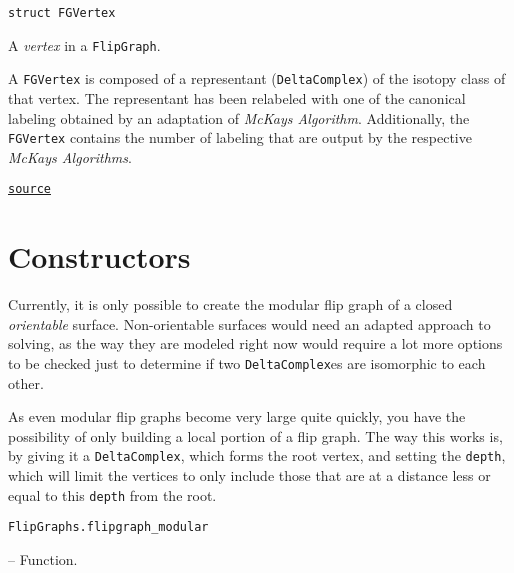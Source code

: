 \begin{adjustwidth}{2em}{0pt}


\begin{verbatim}
struct FGVertex
\end{verbatim}

A \emph{vertex} in a \texttt{FlipGraph}. 

A \texttt{FGVertex} is composed of a representant (\texttt{DeltaComplex}) of the isotopy class of that vertex.  The representant has been relabeled with one of the canonical labeling obtained by an adaptation of \emph{McKay{\textquotesingle}s Algorithm}. Additionally, the \texttt{FGVertex} contains the number of labeling that are output by the respective \emph{McKay{\textquotesingle}s Algorithms}.



\href{https://github.com/schto223/FlipGraphs.jl/blob/e35d43698a06b86273148826b79d585ba04fcd26/src/flipGraph.jl#L33-L41}{\texttt{source}}


\end{adjustwidth}

\section{Constructors}



\label{1468722345706912774}{}


Currently, it is only possible to create the modular flip graph of a closed \emph{orientable} surface. Non-orientable surfaces would need an adapted approach to solving, as the way they are modeled right now would require a lot more options to be checked just to determine if two \texttt{DeltaComplex}es are isomorphic to each other.



As even modular flip graphs become very large quite quickly, you have the possibility of only building a local portion of a flip graph. The way this works is, by giving it a \texttt{DeltaComplex}, which forms the root vertex, and setting the \texttt{depth}, which will limit the vertices to only include those that are at a distance less or equal to this \texttt{depth} from the root.


\hypertarget{11553076379005232901}{\texttt{FlipGraphs.flipgraph\_modular}}  -- {Function.}

